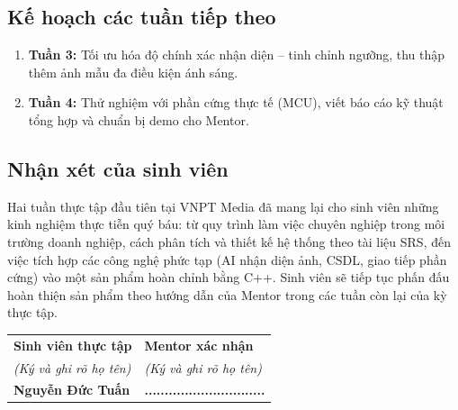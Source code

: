 \documentclass[12pt,a4paper]{article}
\begin{document}
\subsection{Kế hoạch các tuần tiếp theo}
\begin{enumerate}[leftmargin=1.5cm]
    \item \textbf{Tuần 3:} Tối ưu hóa độ chính xác nhận diện -- tinh chỉnh ngưỡng, thu thập thêm ảnh mẫu đa điều kiện ánh sáng.
    \item \textbf{Tuần 4:} Thử nghiệm với phần cứng thực tế (MCU), viết báo cáo kỹ thuật tổng hợp và chuẩn bị demo cho Mentor.
\end{enumerate}

\subsection{Nhận xét của sinh viên}

Hai tuần thực tập đầu tiên tại VNPT Media đã mang lại cho sinh viên những kinh nghiệm thực tiễn quý báu: từ quy trình làm việc chuyên nghiệp trong môi trường doanh nghiệp, cách phân tích và thiết kế hệ thống theo tài liệu SRS, đến việc tích hợp các công nghệ phức tạp (AI nhận diện ảnh, CSDL, giao tiếp phần cứng) vào một sản phẩm hoàn chỉnh bằng C++. Sinh viên sẽ tiếp tục phấn đấu hoàn thiện sản phẩm theo hướng dẫn của Mentor trong các tuần còn lại của kỳ thực tập.

\vspace{2.5cm}
\begin{table}[H]
    \centering
    \begin{tabular}{p{7cm}p{7cm}}
        \centering \textbf{Sinh viên thực tập} & \centering \textbf{Mentor xác nhận} \\[0.4cm]
        \centering \textit{(Ký và ghi rõ họ tên)} & \centering \textit{(Ký và ghi rõ họ tên)} \\[3cm]
        \centering \textbf{Nguyễn Đức Tuấn} & \centering \textbf{..............................} \\
    \end{tabular}
\end{table}
\end{document}
